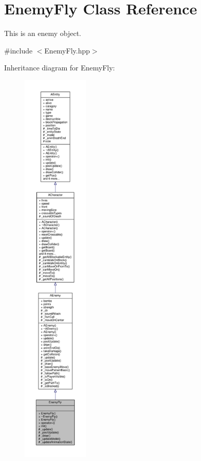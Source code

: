 \hypertarget{class_enemy_fly}{}\section{Enemy\+Fly Class Reference}
\label{class_enemy_fly}


This is an enemy object.  




{\ttfamily \#include $<$Enemy\+Fly.\+hpp$>$}



Inheritance diagram for Enemy\+Fly\+:
\nopagebreak
\begin{figure}[H]
\begin{center}
\leavevmode
\includegraphics[height=550pt]{class_enemy_fly__inherit__graph}
\end{center}
\end{figure}


